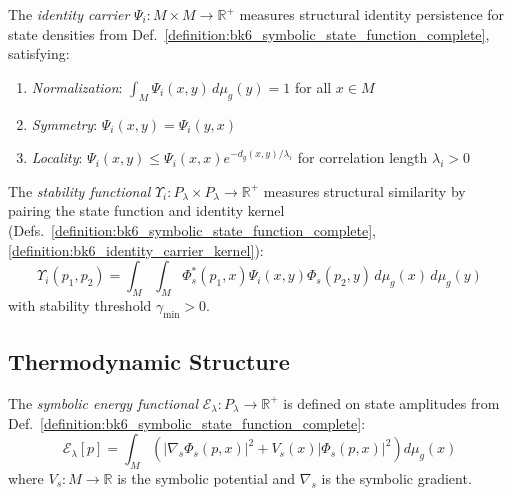 \begin{definition}
\label{definition:bk6_identity_carrier_kernel}
The \emph{identity carrier} $\Psi_i : M \times M \to \mathbb{R}^+$ measures structural identity persistence for state densities from Def.~\ref{definition:bk6_symbolic_state_function_complete}, satisfying:
\begin{enumerate}
\item \emph{Normalization}: $\int_M \Psi_i(x, y) \, d\mu_g(y) = 1$ for all $x \in M$
\item \emph{Symmetry}: $\Psi_i(x, y) = \Psi_i(y, x)$
\item \emph{Locality}: $\Psi_i(x, y) \leq \Psi_i(x, x)e^{-d_g(x,y)/\lambda_i}$ for correlation length $\lambda_i > 0$
\end{enumerate}
\end{definition}

\begin{definition}
\label{definition:bk6_stability_functional_complete}
The \emph{stability functional} $\Upsilon_i : P_{\lambda} \times P_{\lambda} \to \mathbb{R}^+$ measures structural similarity by pairing the state function and identity kernel (Defs.~\ref{definition:bk6_symbolic_state_function_complete}, \ref{definition:bk6_identity_carrier_kernel}):
\begin{equation}
\Upsilon_i(p_1, p_2) = \int_M \int_M \Phi_s^*(p_1, x) \Psi_i(x, y) \Phi_s(p_2, y) \, d\mu_g(x) \, d\mu_g(y)
\end{equation}
with stability threshold $\gamma_{\min} > 0$.
\end{definition}

\subsection{Thermodynamic Structure}
\label{subsec:bk6_thermodynamic_structure}

\begin{definition}
\label{definition:bk6_symbolic_energy_functional}
The \emph{symbolic energy functional} $\mathcal{E}_\lambda : P_\lambda \to \mathbb{R}^+$ is defined on state amplitudes from Def.~\ref{definition:bk6_symbolic_state_function_complete}:
\begin{equation}
\mathcal{E}_\lambda[p] = \int_M \left(|\nabla_s \Phi_s(p,x)|^2 + V_s(x)|\Phi_s(p,x)|^2\right) d\mu_g(x)
\end{equation}
where $V_s : M \to \mathbb{R}$ is the symbolic potential and $\nabla_s$ is the symbolic gradient.
\end{definition}

